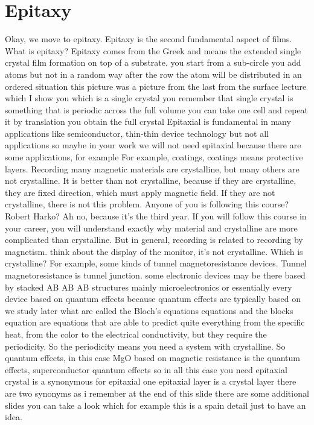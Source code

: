 \chapter{Epitaxy}
Okay, we move to epitaxy. Epitaxy is the second fundamental aspect of films. What is epitaxy? Epitaxy comes from the Greek and means the extended single crystal film formation on top of a substrate. you start from a sub-circle you add atoms but not in a random way after the row the atom will be distributed in an ordered situation this picture was a picture from the last from the surface lecture which I show you which is a single crystal you remember that single crystal is something that is periodic across the full volume you can take one cell and repeat it by translation you obtain the full crystal Epitaxial is fundamental in many applications like semiconductor, thin-thin device technology but not all applications so maybe in your work we will not need epitaxial because there are some applications, for example For example, coatings, coatings means protective layers. Recording many magnetic materials are crystalline, but many others are not crystalline. It is better than not crystalline, because if they are crystalline, they are fixed direction, which must apply magnetic field. If they are not crystalline, there is not this problem. Anyone of you is following this course? Robert Harko? Ah no, because it's the third year. If you will follow this course in your career, you will understand exactly why material and crystalline are more complicated than crystalline. But in general, recording is related to recording by magnetism. think about the display of the monitor, it's not crystalline. Which is crystalline? For example, some kinds of tunnel magnetoresistance devices. Tunnel magnetoresistance is tunnel junction. some electronic devices may be there based by stacked AB AB AB structures mainly microelectronics or essentially every device based on quantum effects because quantum effects are typically based on we study later what are called the Bloch's equations equations and the blocks equation are equations that are able to predict quite everything from the specific heat, from the color to the electrical conductivity, but they require the periodicity. So the periodicity means you need a system with crystalline. So quantum effects, in this case MgO based on magnetic resistance is the quantum effects, superconductor quantum effects so in all this case you need epitaxial crystal is a synonymous for epitaxial one epitaxial layer is a crystal layer there are two synonyms as i remember at the end of this slide there are some additional slides you can take a look which for example this is a spain detail just to have an idea.
